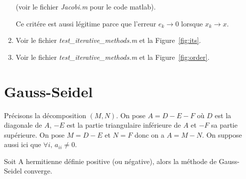 \documentclass[a4paper,10pt]{article}
\begin{document}
\begin{enumerate}
    \hbox{}

    (voir le fichier \emph{Jacobi.m} pour le code matlab).

    Ce critére est aussi légitime parce que l'erreur $e_k \to 0$ lorsque $x_k \to x$.

    \item Voir le fichier \emph{test\_iterative\_methods.m} et la Figure~\ref{fig:its}.

    \item Voir le fichier \emph{test\_iterative\_methods.m} et la Figure~\ref{fig:order}.
\end{enumerate}

\section{Gauss-Seidel}

Précisons la décomposition $(M, N)$. On pose $A = D - E - F$ où $D$ est la diagonale
de $A$, $-E$ est la partie triangulaire inférieure de $A$ et $-F$ sa partie supérieure.
On pose $M = D - E$ et $N = F$ donc on a $A = M - N$. On suppose aussi ici que
$\forall i,\, a_{ii} \neq 0$.

\begin{prop}
Soit A hermitienne définie positive (ou négative), alors la méthode de Gauss-Seidel
converge.
\end{prop}
\end{document}
